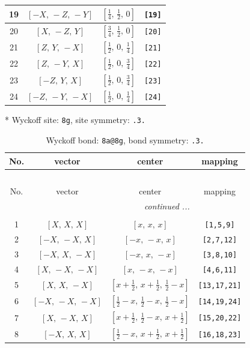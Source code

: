 \documentclass[fleqn,8pt]{jsarticle}
\begin{document}
\begin{longtable}{cccc}
19 & $\left[ - X,\, - Z,\, - Y \right]$ & $\left[ \frac{1}{4},\, \frac{1}{2},\, 0 \right]$ & {\tt [19]} \\ \hline
20 & $\left[ X,\, - Z,\, Y \right]$ & $\left[ \frac{3}{4},\, \frac{1}{2},\, 0 \right]$ & {\tt [20]} \\ \hline
21 & $\left[ Z,\, Y,\, - X \right]$ & $\left[ \frac{1}{2},\, 0,\, \frac{1}{4} \right]$ & {\tt [21]} \\ \hline
22 & $\left[ Z,\, - Y,\, X \right]$ & $\left[ \frac{1}{2},\, 0,\, \frac{3}{4} \right]$ & {\tt [22]} \\ \hline
23 & $\left[ - Z,\, Y,\, X \right]$ & $\left[ \frac{1}{2},\, 0,\, \frac{3}{4} \right]$ & {\tt [23]} \\ \hline
24 & $\left[ - Z,\, - Y,\, - X \right]$ & $\left[ \frac{1}{2},\, 0,\, \frac{1}{4} \right]$ & {\tt [24]} \\
\end{longtable}
* Wyckoff site: {\tt 8g}, site symmetry: {\tt .3.}
\renewcommand{\arraystretch}{1.2}
\begin{longtable}{cccc}
\caption{Wyckoff bond: {\tt 8a@8g}, bond symmetry: {\tt .3.}}
 \\
 \hline \hline
No. & vector & center & mapping \\ \hline \endfirsthead

\multicolumn{3}{l}{\tablename\ \thetable{}} \\
 \hline \hline
No. & vector & center & mapping \\ \hline \endhead

 \hline \hline
\multicolumn{3}{r}{\footnotesize\it continued ...} \\ \endfoot

 \hline \hline
\multicolumn{3}{r}{} \\ \endlastfoot

1 & $\left[ X,\, X,\, X \right]$ & $\left[ x,\, x,\, x \right]$ & {\tt [1,5,9]} \\ \hline
2 & $\left[ - X,\, - X,\, X \right]$ & $\left[ - x,\, - x,\, x \right]$ & {\tt [2,7,12]} \\ \hline
3 & $\left[ - X,\, X,\, - X \right]$ & $\left[ - x,\, x,\, - x \right]$ & {\tt [3,8,10]} \\ \hline
4 & $\left[ X,\, - X,\, - X \right]$ & $\left[ x,\, - x,\, - x \right]$ & {\tt [4,6,11]} \\ \hline
5 & $\left[ X,\, X,\, - X \right]$ & $\left[ x + \frac{1}{2},\, x + \frac{1}{2},\, \frac{1}{2} - x \right]$ & {\tt [13,17,21]} \\ \hline
6 & $\left[ - X,\, - X,\, - X \right]$ & $\left[ \frac{1}{2} - x,\, \frac{1}{2} - x,\, \frac{1}{2} - x \right]$ & {\tt [14,19,24]} \\ \hline
7 & $\left[ X,\, - X,\, X \right]$ & $\left[ x + \frac{1}{2},\, \frac{1}{2} - x,\, x + \frac{1}{2} \right]$ & {\tt [15,20,22]} \\ \hline
8 & $\left[ - X,\, X,\, X \right]$ & $\left[ \frac{1}{2} - x,\, x + \frac{1}{2},\, x + \frac{1}{2} \right]$ & {\tt [16,18,23]} \\
\end{longtable}
\end{document}
